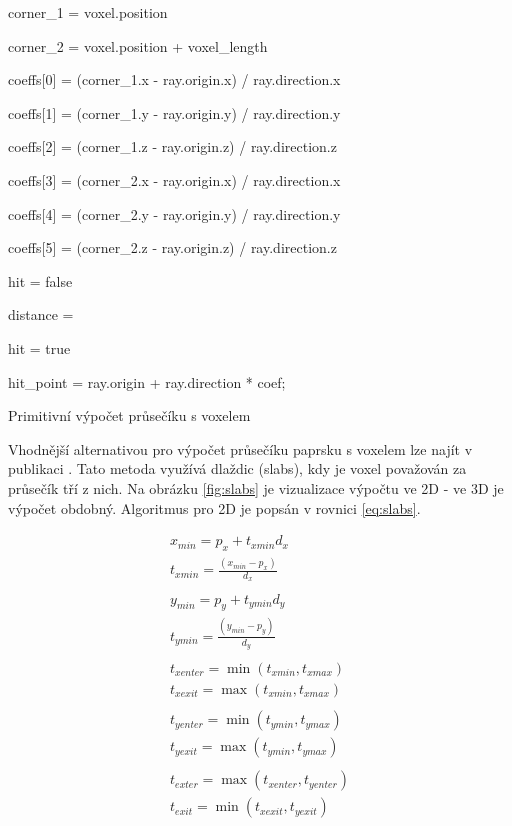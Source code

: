 \begin{center}
\begin{czechalgorithm}[H] \label{alg:ray_box_primitive}
    corner_1 = voxel.position
    
    corner_2 = voxel.position + voxel\_length
    
    coeffs[0] = (corner_1.x - ray.origin.x) / ray.direction.x
    
    coeffs[1] = (corner_1.y - ray.origin.y) / ray.direction.y
    
    coeffs[2] = (corner_1.z - ray.origin.z) / ray.direction.z
    
    coeffs[3] = (corner_2.x - ray.origin.x) / ray.direction.x
    
    coeffs[4] = (corner_2.y - ray.origin.y) / ray.direction.y
    
    coeffs[5] = (corner_2.z - ray.origin.z) / ray.direction.z
    
    hit = false
    
    distance = \inf
    
     {
    
         {
            hit = true
            
            hit\_point = ray.origin + ray.direction * coef;
            
        }
    }
 \caption{Primitivní výpočet průsečíku s voxelem}
\end{czechalgorithm}
\end{center}

Vhodnější alternativou pro výpočet průsečíku paprsku s voxelem lze najít v publikaci \cite{efficient_box_intersect}. Tato metoda využívá dlaždic (slabs), kdy je voxel považován za průsečík tří z nich. Na obrázku \ref{fig:slabs} je vizualizace výpočtu ve 2D - ve 3D je výpočet obdobný. Algoritmus pro 2D je popsán v rovnici \ref{eq:slabs}.


\begin{equation} \label{eq:slabs}
\begin{gathered}
x_{min} = p_x + t_{xmin} d_x\\
t_{xmin} = \frac{(x_{min} - p_x)}{d_x}\\
\\
y_{min} = p_y + t_{ymin} d_y\\
t_{ymin} = \frac{(y_{min} - p_y)}{d_y}\\
\\
t_{xenter} = \min(t_{xmin}, t_{xmax})\\
t_{xexit} = \max(t_{xmin}, t_{xmax})\\
\\
t_{yenter} = \min(t_{ymin}, t_{ymax})\\
t_{yexit} = \max(t_{ymin}, t_{ymax})\\
\\
t_{exter} = \max(t_{xenter}, t_{yenter})\\
t_{exit} = \min(t_{xexit}, t_{yexit})\\
\end{gathered}
\end{equation}


